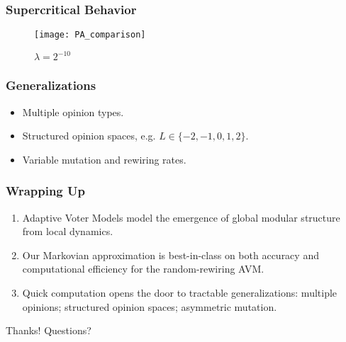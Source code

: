 \documentclass{beamer}
\begin{document}
		
		\begin{frame}\frametitle{Supercritical Behavior}
		  	\begin{figure}
		  		\centering
		  		\texttt{[image: PA\_comparison]}
		  		\caption{$\lambda = 2^{-10}$} 
		  	\end{figure}
		\end{frame}	
		
		\begin{frame}\frametitle{Generalizations}
			\begin{itemize}
				\item Multiple opinion types.
			  	\item Structured opinion spaces, e.g. $L \in \{-2, -1, 0, 1, 2\}$.
			  	\item Variable mutation and rewiring rates.
			\end{itemize}
		\end{frame}
	
		
		\begin{frame}\frametitle{Wrapping Up}
			\begin{enumerate}
			  	\item Adaptive Voter Models model the emergence of global modular structure from local dynamics.
			  	\item Our Markovian approximation is best-in-class on both accuracy and computational efficiency for the random-rewiring AVM. 
			  	\item Quick computation opens the door to tractable generalizations: multiple opinions; structured opinion spaces;  asymmetric mutation. 
		  	\end{enumerate}  
		\end{frame}
	
		\begin{frame}[standout]
			Thanks! Questions? 
		\end{frame}
\end{document}
